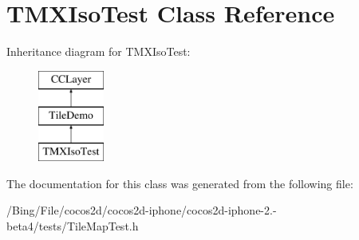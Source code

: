 \hypertarget{interface_t_m_x_iso_test}{\section{T\-M\-X\-Iso\-Test Class Reference}
\label{interface_t_m_x_iso_test}
}
Inheritance diagram for T\-M\-X\-Iso\-Test\-:\begin{figure}[H]
\begin{center}
\leavevmode
\includegraphics[height=3.000000cm]{interface_t_m_x_iso_test}
\end{center}
\end{figure}


The documentation for this class was generated from the following file\-:\begin{DoxyCompactItemize}
\item 
/\-Bing/\-File/cocos2d/cocos2d-\/iphone/cocos2d-\/iphone-\/2.-\/beta4/tests/Tile\-Map\-Test.\-h\end{DoxyCompactItemize}
